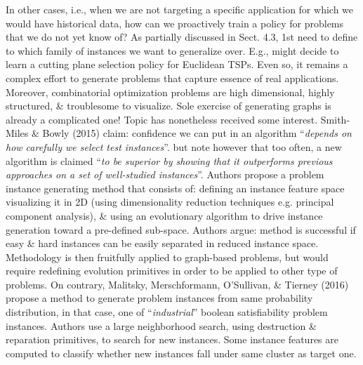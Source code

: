 \documentclass{article}
\begin{document}
\begin{itemize}
\begin{itemize}
        In other cases, i.e., when we are not targeting a specific application for which we would have historical data, how can we proactively train a policy for problems that we do not yet know of? As partially discussed in Sect. 4.3, 1st need to define to which family of instances we want to generalize over. E.g., might decide to learn a cutting plane selection policy for Euclidean TSPs. Even so, it remains a complex effort to generate problems that capture essence of real applications. Moreover, combinatorial optimization problems are high dimensional, highly structured, \& troublesome to visualize. Sole exercise of generating graphs is already a complicated one! Topic has nonetheless received some interest. Smith-Miles \& Bowly (2015) claim: confidence we can put in an algorithm ``{\it depends on how carefully we select test instances}''. but note however that too often, a new algorithm is claimed ``{\it to be superior by showing that it outperforms previous approaches on a set of well-studied instances}''. Authors propose a problem instance generating method that consists of: defining an instance feature space visualizing it in 2D (using dimensionality reduction techniques e.g. principal component analysis), \& using an evolutionary algorithm to drive instance generation toward a pre-defined sub-space. Authors argue: method is successful if easy \& hard instances can be easily separated in reduced instance space. Methodology is then fruitfully applied to graph-based problems, but would require redefining evolution primitives in order to be applied to other type of problems. On contrary, Malitsky, Merschformann, O'Sullivan, \& Tierney (2016) propose a method to generate problem instances from same probability distribution, in that case, one of ``{\it industrial}'' boolean satisfiability problem instances. Authors use a large neighborhood search, using destruction \& reparation primitives, to search for new instances. Some instance features are computed to classify whether new instances fall under same cluster as target one.


\end{itemize}
\end{itemize}
\end{document}
